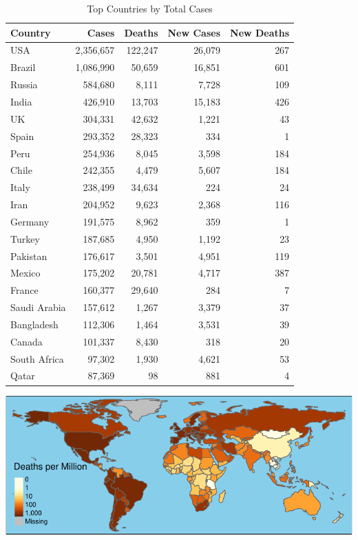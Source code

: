 \documentclass[]{article}
\begin{document}
\newpage

\begin{table}[!h]

\caption{\label{tab:unnamed-chunk-3}Top Countries by Total Cases}
\centering
\begin{tabular}{l|r|r|r|r}
\hline
Country & Cases & Deaths & New Cases & New Deaths\\
\hline
USA & 2,356,657 & 122,247 & 26,079 & 267\\
\hline
Brazil & 1,086,990 & 50,659 & 16,851 & 601\\
\hline
Russia & 584,680 & 8,111 & 7,728 & 109\\
\hline
India & 426,910 & 13,703 & 15,183 & 426\\
\hline
UK & 304,331 & 42,632 & 1,221 & 43\\
\hline
Spain & 293,352 & 28,323 & 334 & 1\\
\hline
Peru & 254,936 & 8,045 & 3,598 & 184\\
\hline
Chile & 242,355 & 4,479 & 5,607 & 184\\
\hline
Italy & 238,499 & 34,634 & 224 & 24\\
\hline
Iran & 204,952 & 9,623 & 2,368 & 116\\
\hline
Germany & 191,575 & 8,962 & 359 & 1\\
\hline
Turkey & 187,685 & 4,950 & 1,192 & 23\\
\hline
Pakistan & 176,617 & 3,501 & 4,951 & 119\\
\hline
Mexico & 175,202 & 20,781 & 4,717 & 387\\
\hline
France & 160,377 & 29,640 & 284 & 7\\
\hline
Saudi Arabia & 157,612 & 1,267 & 3,379 & 37\\
\hline
Bangladesh & 112,306 & 1,464 & 3,531 & 39\\
\hline
Canada & 101,337 & 8,430 & 318 & 20\\
\hline
South Africa & 97,302 & 1,930 & 4,621 & 53\\
\hline
Qatar & 87,369 & 98 & 881 & 4\\
\hline
\end{tabular}
\end{table}

\newpage

\includegraphics{covid_files/figure-latex/unnamed-chunk-4-1.pdf}
\end{document}
